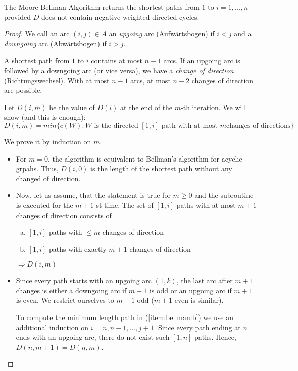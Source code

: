 \begin{thm} %
The Moore-Bellman-Algorithm returns the shortest paths from $1$ to $i = 1,
..., n$ provided $D$ does not contain negative-weighted directed cycles.
\end{thm}
\begin{proof}
We call an arc $(i, j) \in A$ an \emph{upgoing} arc (Aufwärtsbogen) if $i < j$ and a
\emph{downgoing} arc (Abwärtsbogen) if $i > j$.

A shortest path from $1$ to $i$ contains at most $n-1$ arcs. If an upgoing
arc is followed by a downgoing arc (or vice versa), we have a \emph{change
of direction} (Richtungswechsel). With at most $n-1$ arcs, at most $n-2$
changes of direction are possible.

Let $D(i, m)$ be the value of $D(i)$ at the end of the $m$-th iteration.
We will show (and this is enough):
\[ D(i, m) = min \{ c(W): \textrm{$W$ is the directed $[1,i]$-path with at most $m$
changes of directions} \} \]

We prove it by induction on $m$.

\begin{itemize}
\item For $m = 0$, the algorithm is equivalent to Bellman's algorithm for acyclic
grpahs. Thus, $D(i, 0)$ is the length of the shortest path without any
changed of direction.

\item Now, let us assume, that the statement is true for $m \geq 0$ and the
subroutine is executed for the $m+1$-st time. The set of $[1,i]$-paths with
at most $m+1$ changes of direction consists of 
\begin{enumerate}[(a)]
\item\label{item:bellman:a} $[1,i]$-paths with $\leq m$ changes of direction
\item\label{item:bellman:b} $[1,i]$-paths with exactly $m+1$ changes of direction
\end{enumerate}
$\Rightarrow D(i, m)$

\item Since every path starts with an upgoing arc $(1, k)$, the last arc
after $m+1$ changes is either a downgoing arc if $m+1$ is odd or an upgoing
arc if $m+1$ is even. We restrict ourselves to $m+1$ odd ($m+1$ even is
similar).

To compute the minimum length path in (\ref{item:bellman:b}) we use an
additional induction on $i= n, n-1, ..., j+1$. Since every path ending at
$n$ ends with an upgoing arc, there do not exist such $[1,n]$-paths.
Hence, $D(n, m+1) = D(n, m)$.


\end{itemize}
\end{proof}
